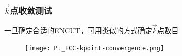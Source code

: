 %

\frame
{
	\frametitle{$\vec k$点收敛测试}
一旦确定合适的\textrm{ENCUT}，可用类似的方式确定$\vec k$点数目%
%
\begin{figure}[h!]
\centering
\texttt{[image: Pt\_FCC-kpoint-convergence.png]}
\caption{\fontsize{6.2pt}{5.2pt}}%
\label{Pt_FCC-kpoint-curve}
\end{figure}
{\fontsize{6.2pt}{5.2pt}}%
}
